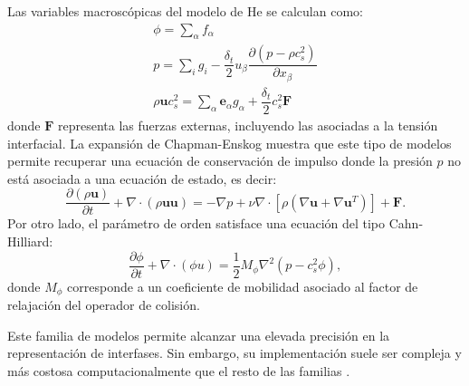 Las variables macrosc\'opicas del modelo de He se calculan como:
\begin{equation}
	\begin{gathered}
		\phi = \sum_{\alpha} f_{\alpha} \\
		p = \sum_i g_i - \dfrac{\delta_t}{2} u_{\beta} \dfrac{\partial(p - \rho c_s^2)}{\partial x_{\beta}} \\
		\rho \bm{u}c_s^2 = \sum_{\alpha} \bm{e}_{\alpha}g_{\alpha} + \dfrac{\delta_t}{2}c_s^2 \bm{F}
	\end{gathered}
	\label{eq:he_macro_variables}
\end{equation}
donde $\bm{F}$ representa las fuerzas externas, incluyendo las asociadas a la tensi\'on interfacial. La expansi\'on de Chapman-Enskog muestra que este tipo de modelos permite recuperar una ecuaci\'on de conservaci\'on de impulso donde la presi\'on $p$ no est\'a asociada a una ecuaci\'on de estado, es decir:
\begin{equation}
	\dfrac{\partial (\rho \bm{u})}{\partial t} + \nabla \cdot (\rho \bm{uu})  = -\nabla p  + \nu \nabla \cdot \left[ \rho (\nabla\bm{u} + \nabla \bm{u}^T) \right] + \bm{F}.
\end{equation}
Por otro lado, el par\'ametro de orden satisface una ecuaci\'on del tipo Cahn-Hilliard:
\begin{equation}
	\dfrac{\partial \phi}{\partial t} + \nabla \cdot (\phi \bm{}u) = \dfrac{1}{2} M_{\phi} \nabla^2 (p - c_s^2 \phi),
\end{equation}
donde $M_{\phi}$ corresponde a un coeficiente de mobilidad asociado al factor de relajaci\'on del operador de colisi\'on. 

Este familia de modelos permite alcanzar una elevada precisi\'on en la representaci\'on de interfases. Sin embargo, su implementaci\'on suele ser compleja y m\'as costosa computacionalmente que el resto de las familias \cite{huang_multiphase_2015}.



